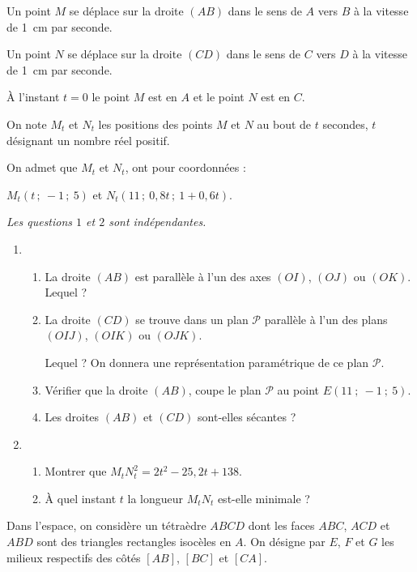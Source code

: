 \documentclass{cornouaille}
\begin{document}
\begin{colonne*exercice}
\begin{exercice}
  Un point $M$ se déplace sur la droite $(AB)$ dans le sens de $A$ vers $B$
  à la vitesse de 1~cm par seconde.

  Un point $N$ se déplace sur la droite $(CD)$ dans le sens de $C$ vers $D$
  à la vitesse de 1~cm par seconde.

  À l'instant $t = 0$ le point $M$ est en $A$ et le point $N$ est en $C$.

  On note $M_t$ et $N_t$ les positions des points $M$ et $N$ au bout
  de $t$ secondes, $t$ désignant un nombre réel positif.

  On admet que $M_t$ et $N_t$, ont pour coordonnées :

  $M_t(t\,;\ -1\,;\ 5)$ et $N_t(11\,;\ 0,8t\,;\ 1 + 0,6 t)$.

  \emph{Les questions $1$ et $2$ sont indépendantes.}

\begin{enumerate}
\item
  \begin{enumerate}
  \item La droite $(AB)$ est parallèle à l'un des axes $(OI)$, $(OJ)$ ou
    $(OK)$. Lequel ?
  \item La droite $(CD)$ se trouve dans un plan $\mathcal{P}$ parallèle
    à l'un des plans $(OIJ)$, $(OIK)$ ou $(OJK)$.
		
    Lequel ? On donnera une représentation paramétrique de ce plan
    $\mathcal{P}$.
  \item Vérifier que la droite $(AB)$, coupe le plan $\mathcal{P}$ au
    point $E(11~;~-1~;~5)$.
  \item Les droites $(AB)$ et $(CD)$ sont-elles sécantes ?
  \end{enumerate}
\item
  \begin{enumerate}
  \item Montrer que $M_t^{}N_t ^2 = 2 t^2 - 25,2 t + 138$.
  \item À quel instant $t$ la longueur $M_tN_t$ est-elle minimale ?
  \end{enumerate}
\end{enumerate}
\end{exercice}

\begin{exercice}
  Dans l'espace, on considère un tétraèdre $ABCD$ dont les faces
  $ABC$, $ACD$ et $ABD$ sont des triangles rectangles isocèles en
  $A$. On désigne par $E$, $F$ et $G$ les milieux respectifs des côtés
  $[AB]$, $[BC]$ et $[CA]$.


\end{exercice}
\end{colonne*exercice}
\end{document}
